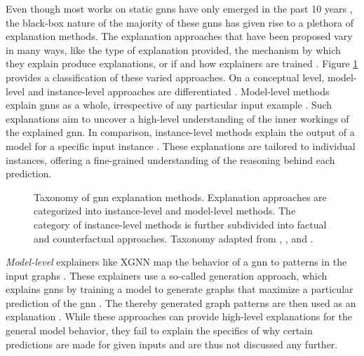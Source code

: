 Even though most works on static \glspl{gnn} have only emerged in the past 10 years \cite{wu_comprehensive_2021}, the black-box nature of the majority of these \glspl{gnn} has given rise to a plethora of explanation methods. The explanation approaches that have been proposed vary in many ways, like the type of explanation provided, the mechanism by which they explain produce explanations, or if and how explainers are trained \cite{kakkad_survey_2023}. Figure \ref{f_taxonomy_explainers} provides a classification of these varied approaches. On a conceptual level, model-level and instance-level approaches are differentiated \cite{yuan_explainability_2020}. Model-level methods explain \glspl{gnn} as a whole, irrespective of any particular input example \cite{yuan_explainability_2020}. Such explanations aim to uncover a high-level understanding of the inner workings of the explained \gls{gnn}. In comparison, instance-level methods explain the output of a model for a specific input instance \cite{yuan_explainability_2020}. These explanations are tailored to individual instances, offering a fine-grained understanding of the reasoning behind each prediction.

\begin{figure}[ht]
    \centering
    
    \caption{Taxonomy of \gls{gnn} explanation methods. Explanation approaches are categorized into instance-level and model-level methods. The category of instance-level methods is further subdivided into factual and counterfactual approaches. Taxonomy adapted from \cite{yuan_explainability_2020}, \cite{prado-romero_survey_2023}, and \cite{kakkad_survey_2023}.}
    \label{f_taxonomy_explainers}

\end{figure}

\textit{Model-level} explainers like XGNN \cite{yuan_xgnn_2020} map the behavior of a \gls{gnn} to patterns in the input graphs \cite{yuan_explainability_2020}. These explainers use a so-called generation approach, which explains \glspl{gnn} by training a model to generate graphs that maximize a particular prediction of the \gls{gnn} \cite{yuan_explainability_2020, yuan_xgnn_2020}. The thereby generated graph patterns are then used as an explanation \cite{yuan_xgnn_2020}. While these approaches can provide high-level explanations for the general model behavior, they fail to explain the specifics of why certain predictions are made for given inputs and are thus not discussed any further.

